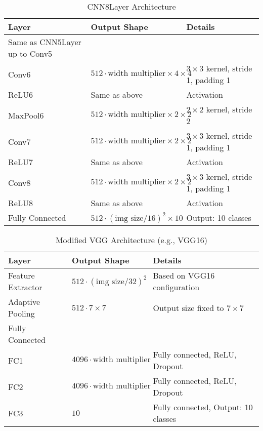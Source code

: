 \begin{table}[h]
    \centering
    \caption{CNN8Layer Architecture}
    \label{tab:cnn8layer}
    \begin{tabular}{lll}
    \toprule
    \textbf{Layer} & \textbf{Output Shape} & \textbf{Details} \\
    \midrule
    Same as CNN5Layer up to Conv5 & & \\
    Conv6 & $512 \cdot \text{width multiplier} \times 4 \times 4$ & $3 \times 3$ kernel, stride 1, padding 1 \\
    ReLU6 & Same as above & Activation \\
    MaxPool6 & $512 \cdot \text{width multiplier} \times 2 \times 2$ & $2 \times 2$ kernel, stride 2 \\
    Conv7 & $512 \cdot \text{width multiplier} \times 2 \times 2$ & $3 \times 3$ kernel, stride 1, padding 1 \\
    ReLU7 & Same as above & Activation \\
    Conv8 & $512 \cdot \text{width multiplier} \times 2 \times 2$ & $3 \times 3$ kernel, stride 1, padding 1 \\
    ReLU8 & Same as above & Activation \\
    Fully Connected & $512 \cdot (\text{img size}/16)^2 \times 10$ & Output: 10 classes \\
    \bottomrule
    \end{tabular}
\end{table}

\begin{table}[h]
    \centering
    \caption{Modified VGG Architecture (e.g., VGG16)}
    \label{tab:vgg16}
    \begin{tabular}{lll}
    \toprule
    \textbf{Layer} & \textbf{Output Shape} & \textbf{Details} \\
    \midrule
    Feature Extractor & $512 \cdot (\text{img size}/32)^2$ & Based on VGG16 configuration \\
    Adaptive Pooling & $512 \cdot 7 \times 7$ & Output size fixed to $7 \times 7$ \\
    Fully Connected & & \\
    FC1 & $4096 \cdot \text{width multiplier}$ & Fully connected, ReLU, Dropout \\
    FC2 & $4096 \cdot \text{width multiplier}$ & Fully connected, ReLU, Dropout \\
    FC3 & $10$ & Fully connected, Output: 10 classes \\
    \bottomrule
    \end{tabular}
\end{table}
